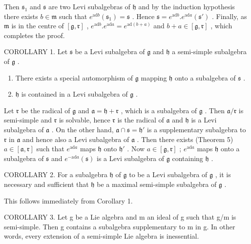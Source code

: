 Then \(\mathfrak{s}_1\) and \(\mathfrak{s}\) are two Levi subalgebras of \(\mathfrak{h}\) and by the induction hypothesis there exists \(b\in \mathfrak{m}\) such that \(e^{\mathrm{ad}b}(\mathfrak{s}_1) = \mathfrak{s}\) . Hence \(\mathfrak{s} = e^{\mathrm{ad}b}.e^{\mathrm{ad}a}(\mathfrak{s}')\) . Finally, as \(\mathfrak{m}\) is in the centre of \([\mathfrak{g},\mathfrak{r}]\) , \(e^{\mathrm{ad}b}.e^{\mathrm{ad}a} = e^{\mathrm{ad}(b + a)}\) and \(b + a\in [\mathfrak{g},\mathfrak{r}]\) , which completes the proof.

COROLLARY 1. Let \(\mathfrak{s}\) be a Levi subalgebra of \(\mathfrak{g}\) and \(\mathfrak{h}\) a semi-simple subalgebra of \(\mathfrak{g}\) .

\begin{enumerate}
\def\labelenumi{(\alph{enumi})}
\item
  There exists a special automorphism of \(\mathfrak{g}\) mapping \(\mathfrak{h}\) onto a subalgebra of \(\mathfrak{s}\) .
\item
  \(\mathfrak{h}\) is contained in a Levi subalgebra of \(\mathfrak{g}\) .
\end{enumerate}

Let \(\mathfrak{r}\) be the radical of \(\mathfrak{g}\) and \(\mathfrak{a} = \mathfrak{h} + \mathfrak{r}\) , which is a subalgebra of \(\mathfrak{g}\) . Then \(\mathfrak{a}/\mathfrak{r}\) is semi-simple and \(\mathfrak{r}\) is solvable, hence \(\mathfrak{r}\) is the radical of \(\mathfrak{a}\) and \(\mathfrak{h}\) is a Levi subalgebra of \(\mathfrak{a}\) . On the other hand, \(\mathfrak{a} \cap \mathfrak{s} = \mathfrak{h}'\) is a supplementary subalgebra to \(\mathfrak{r}\) in \(\mathfrak{a}\) and hence also a Levi subalgebra of \(\mathfrak{a}\) . Then there exists (Theorem 5) \(a \in [\mathfrak{a}, \mathfrak{r}]\) such that \(e^{\mathrm{ad} a}\) maps \(\mathfrak{h}\) onto \(\mathfrak{h}'\) . Now \(a \in [\mathfrak{g}, \mathfrak{r}]\) ; \(e^{\mathrm{ad} a}\) maps \(\mathfrak{h}\) onto a subalgebra of \(\mathfrak{s}\) and \(e^{-\mathrm{ad} a}(\mathfrak{s})\) is a Levi subalgebra of \(\mathfrak{g}\) containing \(\mathfrak{h}\) .

COROLLARY 2. For a subalgebra \(\mathfrak{h}\) of \(\mathfrak{g}\) to be a Levi subalgebra of \(\mathfrak{g}\) , it is necessary and sufficient that \(\mathfrak{h}\) be a maximal semi-simple subalgebra of \(\mathfrak{g}\) .

This follows immediately from Corollary 1.

COROLLARY 3. Let g be a Lie algebra and m an ideal of g such that g/m is semi-simple. Then g contains a subalgebra supplementary to m in g. In other words, every extension of a semi-simple Lie algebra is inessential.

